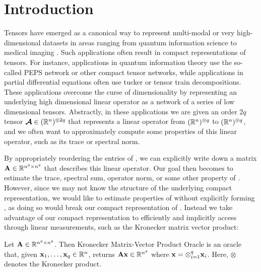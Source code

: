 
\section{Introduction}

Tensors have emerged as a canonical way to represent multi-modal or very high-dimensional datasets in areas ranging from quantum information science \cite{biamonte2019lectures} to medical imaging \cite{selvan2020tensor, sedighin2024tensor}.
Such applications often result in compact representations of tensors.
For instance, applications in quantum information theory use the so-called PEPS network or other compact tensor networks, while applications in partial differential equations often use tucker or tensor train decompositions. These applications overcome the curse of dimensionality by representing an underlying high dimensional linear operator as a network of a series of low dimensional tensors.
Abstractly, in these applications we are given an order \(2q\) tensor \(\boldsymbol{\mathcal{A}} \in ({\mathbb R}^{n})^{\otimes 2q}\) that represents a linear operator from \(({\mathbb R}^{n})^{\otimes q}\) to \(({\mathbb R}^n)^{\otimes q}\), and we often want to approximately compute some properties of this linear operator, such as its trace or spectral norm.

By appropriately reordering the entries of \tA, we can explicitly write down a matrix \(\mathbf{A} \in {\mathbb R}^{n^q \times n^q}\) that describes this linear operator.
Our goal then becomes to estimate the trace, spectral sum, operator norm, or some other property of \mA.
However, since we may not know the structure of the underlying compact representation, we would like to estimate properties of \mA without explicitly forming \mA, as doing so would break our compact representation of \tA.
Instead we take advantage of our compact representation to efficiently and implicitly access \mA through linear measurements, such as the Kronecker matrix vector product:

\begin{definition}
	Let \(\mathbf{A}\in{\mathbb R}^{n^q \times n^q}\).
	Then Kronecker Matrix-Vector Product Oracle is an oracle that, given \(\boldsymbol{\mathrm{x}}_1,\ldots,\boldsymbol{\mathrm{x}}_q\in{\mathbb R}^n\), returns \(\mathbf{A}\boldsymbol{\mathrm{x}}\in{\mathbb R}^{n^q}\) where \(\boldsymbol{\mathrm{x}} = \otimes_{i=1}^q \boldsymbol{\mathrm{x}}_i\).
	Here, \(\otimes\) denotes the Kronecker product.
\end{definition}


